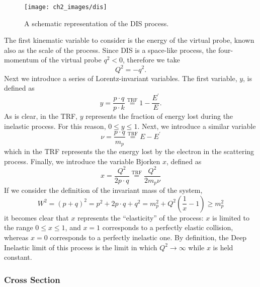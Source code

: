 \documentclass[10pt,a4paper]{book}
\begin{document}
\begin{figure}
\centering
\texttt{[image: ch2\_images/dis]}
\caption{A schematic representation of the DIS process.}
\label{DIS diagram}
\end{figure}

The first kinematic variable to consider is the energy of the virtual probe, known also as the scale of the process. Since DIS is a space-like process, the four-momentum of the virtual probe $q^2 < 0$, therefore we take
\begin{equation}
Q^2 = -q^2.
\end{equation}
Next we introduce a series of Lorentz-invariant variables. The first variable, $y$, is defined as
\begin{equation}
y = \frac{p\cdot q}{p\cdot k} \overset{\mathrm{TRF}}{=} 1 - \frac{E^\prime}{E}.
\end{equation}
As is clear, in the TRF, $y$ represents the fraction of energy lost during the inelastic process. For this reason, $0 \leq y \leq 1$.
Next, we introduce a similar variable
\begin{equation}
\nu = \frac{p\cdot q}{m_p} \overset{\mathrm{TRF}}{=} E - E^\prime
\end{equation}
which in the TRF represents the the energy lost by the electron in the scattering process.
Finally, we introduce the variable Bjorken $x$, defined as
\begin{equation}
x = \frac{Q^2}{2p\cdot q} \overset{\mathrm{TRF}}{=} \frac{Q^2}{2m_p\nu}
\end{equation} 
If we consider the definition of the invariant mass of the system,
\begin{equation}
W^2 = (p + q)^2 = p^2 + 2p\cdot q + q^2 = m_p^2 + Q^2\left(\frac{1}{x} - 1\right) \geq m_p^2
\end{equation}
it becomes clear that $x$ represents the ``elasticity'' of the process: $x$ is limited to the range $0 \leq x \leq 1$, and $x = 1$ corresponds to a perfectly elastic collision, whereas $x = 0$ corresponds to a perfectly inelastic one. By definition, the Deep Inelastic limit of this process is the limit in which $Q^2 \rightarrow \infty$ while $x$ is held constant.
 
\subsubsection{Cross Section}
\end{document}
